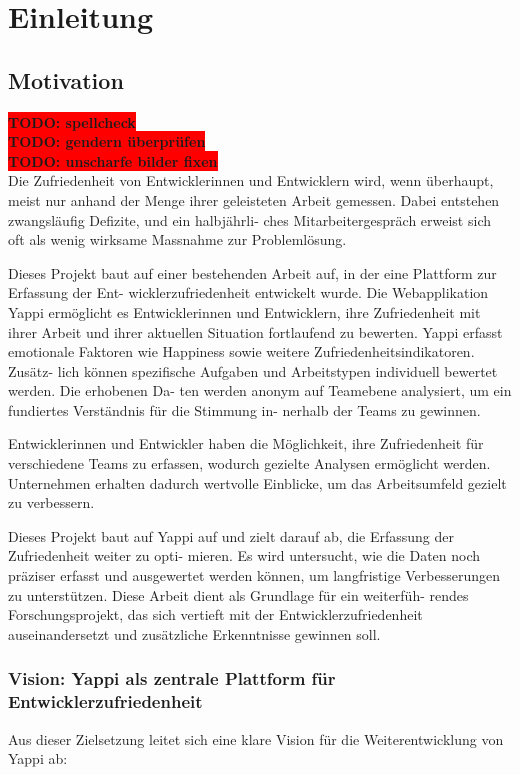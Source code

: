 \documentclass[12pt,a4paper]{report}
\newcommand{\todo}[1]{\colorbox{red}{\textbf{TODO: #1}}\\}
\begin{document}
\chapter{Einleitung}

\section{Motivation}
\todo{spellcheck}
\todo{gendern überprüfen}
\todo{unscharfe bilder fixen}

Die Zufriedenheit von Entwicklerinnen und Entwicklern wird, wenn überhaupt, meist nur anhand der
Menge ihrer geleisteten Arbeit gemessen. Dabei entstehen zwangsläufig Defizite, und ein halbjährli-
ches Mitarbeitergespräch erweist sich oft als wenig wirksame Massnahme zur Problemlösung.

Dieses Projekt baut auf einer bestehenden Arbeit auf, in der eine Plattform zur Erfassung der Ent-
wicklerzufriedenheit entwickelt wurde. Die Webapplikation Yappi ermöglicht es Entwicklerinnen und
Entwicklern, ihre Zufriedenheit mit ihrer Arbeit und ihrer aktuellen Situation fortlaufend zu bewerten.
Yappi erfasst emotionale Faktoren wie Happiness sowie weitere Zufriedenheitsindikatoren. Zusätz-
lich können spezifische Aufgaben und Arbeitstypen individuell bewertet werden. Die erhobenen Da-
ten werden anonym auf Teamebene analysiert, um ein fundiertes Verständnis für die Stimmung in-
nerhalb der Teams zu gewinnen.

Entwicklerinnen und Entwickler haben die Möglichkeit, ihre Zufriedenheit für verschiedene Teams zu
erfassen, wodurch gezielte Analysen ermöglicht werden. Unternehmen erhalten dadurch wertvolle
Einblicke, um das Arbeitsumfeld gezielt zu verbessern.

Dieses Projekt baut auf Yappi auf und zielt darauf ab, die Erfassung der Zufriedenheit weiter zu opti-
mieren. Es wird untersucht, wie die Daten noch präziser erfasst und ausgewertet werden können,
um langfristige Verbesserungen zu unterstützen. Diese Arbeit dient als Grundlage für ein weiterfüh-
rendes Forschungsprojekt, das sich vertieft mit der Entwicklerzufriedenheit auseinandersetzt und
zusätzliche Erkenntnisse gewinnen soll.

\subsection{Vision: Yappi als zentrale Plattform für Entwicklerzufriedenheit}

Aus dieser Zielsetzung leitet sich eine klare Vision für die Weiterentwicklung von Yappi ab:
\end{document}

